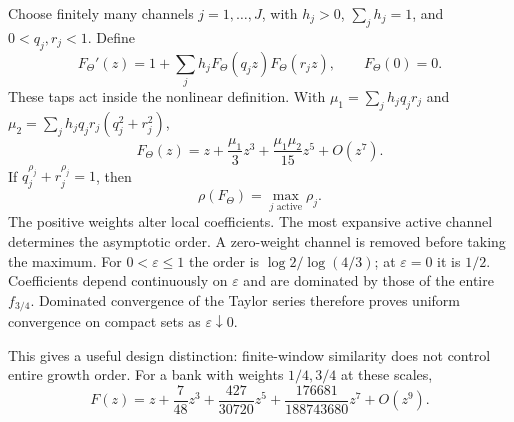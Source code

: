 \documentclass[11pt,oneside,openany]{book}
\begin{document}
\label{sec:banks}
Choose finitely many channels $j=1,\ldots,J$, with $h_j>0$, $\sum_jh_j=1$,
and $0<q_j,r_j<1$. Define
\[
F_\Theta'(z)=1+\sum_jh_jF_\Theta(q_jz)F_\Theta(r_jz),\qquad F_\Theta(0)=0.
\]
These taps act inside the nonlinear definition. With
$\mu_1=\sum_jh_jq_jr_j$ and
$\mu_2=\sum_jh_jq_jr_j(q_j^2+r_j^2)$,
\[
F_\Theta(z)=z+\frac{\mu_1}{3}z^3+\frac{\mu_1\mu_2}{15}z^5+O(z^7).
\]
If $q_j^{\rho_j}+r_j^{\rho_j}=1$, then
\[
\boxed{\rho(F_\Theta)=\max_{j\text{ active}}\rho_j.}
\]
The positive weights alter local coefficients. The most expansive active
channel determines the asymptotic order. A zero-weight channel is removed
before taking the maximum.
For $0<\varepsilon\le1$ the order is $\log2/\log(4/3)$; at $\varepsilon=0$
it is $1/2$. Coefficients depend continuously on $\varepsilon$ and are
dominated by those of the entire $f_{3/4}$. Dominated convergence of the Taylor
series therefore proves uniform convergence on compact sets as
$\varepsilon\downarrow0$.

This gives a useful design distinction: finite-window similarity does not
control entire growth order. For a bank with weights $1/4,3/4$ at these scales,
\[
F(z)=z+\frac7{48}z^3+\frac{427}{30720}z^5+
\frac{176681}{188743680}z^7+O(z^9).
\]




\end{document}
